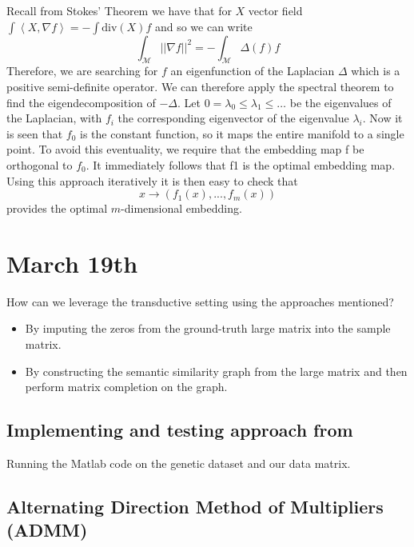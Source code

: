\documentclass[12pt]{article}
\begin{document}
Recall from Stokes' Theorem we have that for $X$ vector field $\int{\left<X,\nabla f\right>} = -\int{\text{div}(X) f}$ and so we can write
\begin{equation*}
    \int_\mathcal{M}{||\nabla f||^2} = -\int_\mathcal{M}{\Delta(f)f}
\end{equation*}
Therefore, we are searching for $f$ an eigenfunction of the Laplacian $\Delta$ which is a positive semi-definite operator. We can therefore apply the spectral theorem to find the eigendecomposition of $-\Delta$. Let $0 = \lambda_0 \le \lambda_1 \le \dots$ be the eigenvalues of the Laplacian, with $f_i$ the corresponding eigenvector of the eigenvalue $\lambda_i$. Now it is seen that $f_0$ is the constant function, so it maps the entire manifold to a single point. To avoid this eventuality, we require that the embedding map f be orthogonal to $f_0$. It immediately follows that f1 is the optimal embedding map. Using this approach iteratively it is then easy to check that
\begin{equation*}
    x \to (f_1(x),..., f_m(x))
\end{equation*}
provides the optimal $m$-dimensional embedding.

\section{March 19th}

How can we leverage the transductive setting using the approaches mentioned?

\begin{itemize}
    \item By imputing the zeros from the ground-truth large matrix into the sample matrix.
    \item By constructing the semantic similarity graph from the large matrix and then perform matrix completion on the graph.
\end{itemize}

\subsection{Implementing and testing approach from \cite{kalofolias2014}}

Running the Matlab code on the genetic dataset and our data matrix.

\subsection{Alternating Direction Method of Multipliers (ADMM)}






\newpage
\printbibliography
\end{document}
